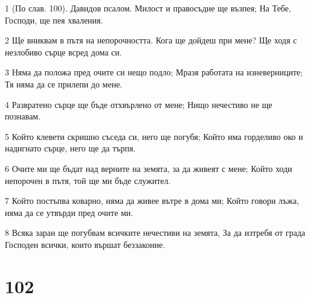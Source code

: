 \par 1 (По слав. 100). Давидов псалом. Милост и правосъдие ще възпея; На Тебе, Господи, ще пея хваления.
\par 2 Ще вниквам в пътя на непорочността. Кога ще дойдеш при мене? Ще ходя с незлобиво сърце всред дома си.
\par 3 Няма да положа пред очите си нещо подло; Мразя работата на изневерниците; Тя няма да се прилепи до мене.
\par 4 Развратено сърце ще бъде отхвърлено от мене; Нищо нечестиво не ще познавам.
\par 5 Който клевети скришно съседа си, него ще погубя; Който има горделиво око и надигнато сърце, него ще да търпя.
\par 6 Очите ми ще бъдат над верните на земята, за да живеят с мене; Който ходи непорочен в пътя, той ще ми бъде служител.
\par 7 Който постъпва коварно, няма да живее вътре в дома ми; Който говори лъжа, няма да се утвърди пред очите ми.
\par 8 Всяка заран ще погубвам всичките нечестиви на земята, За да изтребя от града Господен всички, които вършат беззаконие.

\chapter{102}


